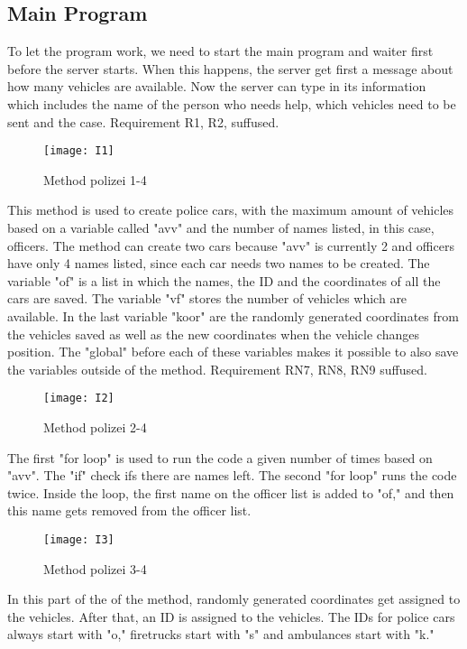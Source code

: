 \documentclass{article}
\begin{document}
\subsection{Main Program}
To let the program work, we need to start the main program and waiter first before the server starts. When this happens, the server get first a message about how many vehicles are available. Now the server can type in its information which includes the name of the person who needs help, which vehicles need to be sent and the case.
 Requirement R1, R2, suffused.
\begin{figure}[htp]
    \centering
\texttt{[image: I1]}
   \caption{Method polizei 1-4}
    \label{fig:GALAXY}
\end{figure}
\newline
\newline
This method is used to create police cars, with the maximum amount of vehicles based on a variable called "avv" and the number of names listed, in this case, officers. The method can create two cars because "avv" is currently 2 and officers have only 4 names listed, since each car needs two names to be created.
\newline
The variable "of" is a list in which the names, the ID and the coordinates of all the cars are saved.
The variable "vf" stores the number of vehicles which are available.
In the last variable "koor" are the randomly generated coordinates from the vehicles saved as well as the new coordinates when the vehicle changes position.
\newline
The "global" before each of these variables makes it possible to also save the variables outside of the method. Requirement RN7, RN8, RN9 suffused.

\clearpage
\begin{figure}[htp]
    \centering
\texttt{[image: I2]}
   \caption{Method polizei 2-4}
    \label{fig:GALAXY}
\end{figure}
\newline
\newline
The first "for loop" is used to run the code a given number of times based on "avv". 
The "if" check ifs there are names left.
\newline
The second "for loop" runs the code twice. Inside the loop, the first name on the officer list is added to "of," and then this name gets removed from the officer list. 
\newline
\newline
\begin{figure}[htp]
    \centering
\texttt{[image: I3]}
   \caption{Method polizei 3-4}
    \label{fig:GALAXY}
\end{figure}
\newline
\newline
In this part of the of the method, randomly generated coordinates get assigned to the vehicles.
After that, an ID is assigned to the vehicles. The IDs for police cars always start with "o,"  firetrucks start with "s" and ambulances start with "k."
\end{document}
